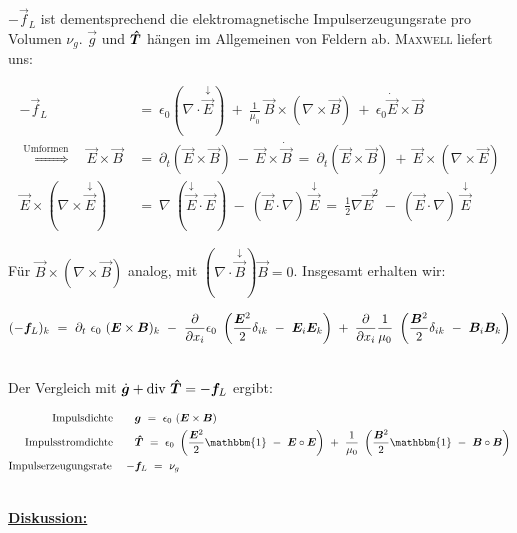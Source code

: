 $ - \vec{f}_L$ ist dementsprechend die elektromagnetische Impulserzeugungsrate pro Volumen $\nu_g$.
$\vec{g}$ und $\bm{\hat{T}}$ hängen im Allgemeinen von Feldern ab. \textsc{Maxwell} liefert uns:

\begin{align*}
- \vec{f}_L \ &= \ \epsilon_0 ( \nabla \cdot\overset{\downarrow}{\vec{E}} ) \ + \ \frac{1}{\mu_0} \ \vec{B} \times (\nabla \times \vec{B}) \ + \ \epsilon_0 \dot{\vec{E}} \times \vec{B}\\
\overset{\text{Umformen}}{\Longrightarrow} \quad\vec{E}\times\vec{B} \ &= \ \partial_t ( \vec{E} \times \vec{B} ) \ - \ \vec{E}\times\dot{\vec{B}} \ =  \ \partial_t (\vec{E}\times\vec{B}) \ + \ \vec{E}\times (\nabla\times\vec{E})\\
\vec{E}\times ( \nabla\times \overset{\downarrow}{\vec{E}} ) \ &= \ \nabla \ (\overset{\downarrow}{\vec{E}}\cdot\vec{E} ) \ - \ ( \vec{E}\cdot\nabla ) \ \overset{\downarrow}{\vec{E}} \ = \ \frac{1}{2}\nabla\vec{E}^2 \ - \ ( \vec{E}\cdot\nabla) \ \overset{\downarrow}{\vec{E}}
\end{align*}

Für $\vec{B}\times(\nabla\times\vec{B})$ analog, mit $(\nabla\cdot\overset{\downarrow}{\vec{B}})\vec{B}=0$. Insgesamt erhalten wir:

\begin{equation*}
(-\vec{f}_L)_k \ = \ \partial_t \ \epsilon_0 \ (\vec{E}\times\vec{B})_k \ - \ \pdiff{}{x_i} \epsilon_0 \ \left(\frac{\vec{E}^2}{2} \delta_{ik} \ - \ \vec{E}_i \vec{E}_k \right) \; + \; \pdiff{}{x_i} \frac{1}{\mu_0} \ \left(\frac{\vec{B}^2}{2}\delta_{ik} \ - \ \vec{B}_i \vec{B}_k \right) 
\end{equation*}

\ \\
Der Vergleich mit $\dot{\bm{g}} + \text{div }\bm{\hat{T}} = - \bm{f}_L$ ergibt:

\begin{align*}
\text{Impulsdichte} \qquad & \vec{g} \ = \ \epsilon_0 \ (\vec{E}\times\vec{B})\\
\text{Impulsstromdichte} \qquad & \tens{T} \ = \ \epsilon_0 \ \left(\frac{\vec{E}^2}{2} \mathbbm{1} \ - \ \vec{E}\circ\vec{E}\right) \ + \ \frac{1}{\mu_0} \ \left(\frac{\vec{B}^2}{2}\mathbbm{1} \ - \ \vec{B}\circ\vec{B}\right)\\
\text{Impulserzeugungsrate} \quad \ - & \vec{f}_L \ = \ \nu_g
\end{align*}

\ \\
\underline{\textbf{Diskussion:}}

